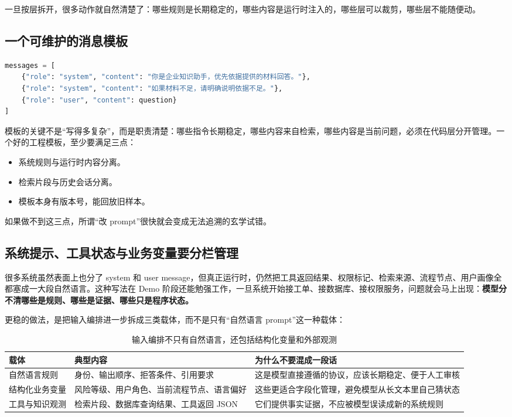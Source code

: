 一旦按层拆开，很多动作就自然清楚了：哪些规则是长期稳定的，哪些内容是运行时注入的，哪些层可以裁剪，哪些层不能随便动。

\subsection{一个可维护的消息模板}
\begin{lstlisting}[language=Python]
messages = [
    {"role": "system", "content": "你是企业知识助手，优先依据提供的材料回答。"},
    {"role": "system", "content": "如果材料不足，请明确说明依据不足。"},
    {"role": "user", "content": question}
]
\end{lstlisting}

模板的关键不是“写得多复杂”，而是职责清楚：哪些指令长期稳定，哪些内容来自检索，哪些内容是当前问题，必须在代码层分开管理。一个好的工程模板，至少要满足三点：
\begin{itemize}
  \item 系统规则与运行时内容分离。
  \item 检索片段与历史会话分离。
  \item 模板本身有版本号，能回放旧样本。
\end{itemize}

如果做不到这三点，所谓“改 prompt”很快就会变成无法追溯的玄学试错。

\subsection{系统提示、工具状态与业务变量要分栏管理}
很多系统虽然表面上也分了 system 和 user message，但真正运行时，仍然把工具返回结果、权限标记、检索来源、流程节点、用户画像全都塞成一大段自然语言。这种写法在 Demo 阶段还能勉强工作，一旦系统开始接工单、接数据库、接权限服务，问题就会马上出现：\textbf{模型分不清哪些是规则、哪些是证据、哪些只是程序状态。}

更稳的做法，是把输入编排进一步拆成三类载体，而不是只有“自然语言 prompt”这一种载体：
\begin{table}[H]
\centering
\small
\begin{tabularx}{\textwidth}{>{\raggedright\arraybackslash}p{2.9cm}>{\raggedright\arraybackslash}p{3.2cm}>{\raggedright\arraybackslash}X}
\toprule
\textbf{载体} & \textbf{典型内容} & \textbf{为什么不要混成一段话} \\
\midrule
自然语言规则 & 身份、输出顺序、拒答条件、引用要求 & 这是模型直接遵循的协议，应该长期稳定、便于人工审核 \\
结构化业务变量 & 风险等级、用户角色、当前流程节点、语言偏好 & 这些更适合字段化管理，避免模型从长文本里自己猜状态 \\
工具与知识观测 & 检索片段、数据库查询结果、工具返回 JSON & 它们提供事实证据，不应被模型误读成新的系统规则 \\
\bottomrule
\end{tabularx}
\caption{输入编排不只有自然语言，还包括结构化变量和外部观测}
\label{tab:prompt-runtime-carriers}
\end{table}

